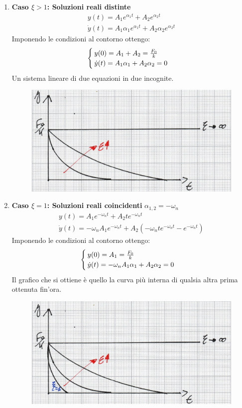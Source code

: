 \documentclass[a4paper, 15pt]{article}
\begin{document}
\begin{adjustwidth}{2in}{}
\begin{enumerate}[label=(\Roman*)]
	\item \textbf{Caso $\xi>1$: Soluzioni reali distinte}
	\begin{eqnarray*}
		y(t) = A_1e^{\alpha_1 t} + A_2e^{\alpha_2 t} \\
		\dot{y}(t) = A_1\alpha_1e^{\alpha_1 t} + A_2\alpha_2e^{\alpha_2 t}
	\end{eqnarray*}  
	Imponendo le condizioni al contorno ottengo:
	\[ \begin{cases}
		y(0) = A_1 + A_2 = {F_0 \over k } \\
		\dot{y}(t) = A_1\alpha_1 + A_2\alpha_2 = 0
	\end{cases}\]
	Un sistema lineare di due equazioni in due incognite. 	
\begin{figure}[H]
	\centering
	\includegraphics[width=0.5\linewidth]{fig/mm9}
	\label{fig:mm9}
\end{figure}	
	\item \textbf{Caso $\xi=1$: Soluzioni reali coincidenti} \(\alpha_{1,2} = -\omega_n\) \newline
	\begin{eqnarray*}
		y(t) = A_1e^{-\omega_n t} + A_2te^{-\omega_n t} \\
		\dot{y}(t) = -\omega_nA_1e^{-\omega_n t} + A_2\left(-\omega_nte^{-\omega_n t} - e^{-\omega_n t}\right)
	\end{eqnarray*}
	Imponendo le condizioni al contorno ottengo:
	\[ \begin{cases}
		y(0) = A_1 = {F_0 \over k } \\
		\dot{y}(t) = -\omega_nA_1\alpha_1 + A_2\alpha_2 = 0
	\end{cases}\]
	Il grafico che si ottiene è quello la curva più interna di qualsia altra prima ottenuta fin'ora.  	
\begin{figure}[H]
	\centering
	\includegraphics[width=0.5\linewidth]{fig/mm10}

\end{figure}
\end{enumerate}
\end{adjustwidth}
\end{document}
